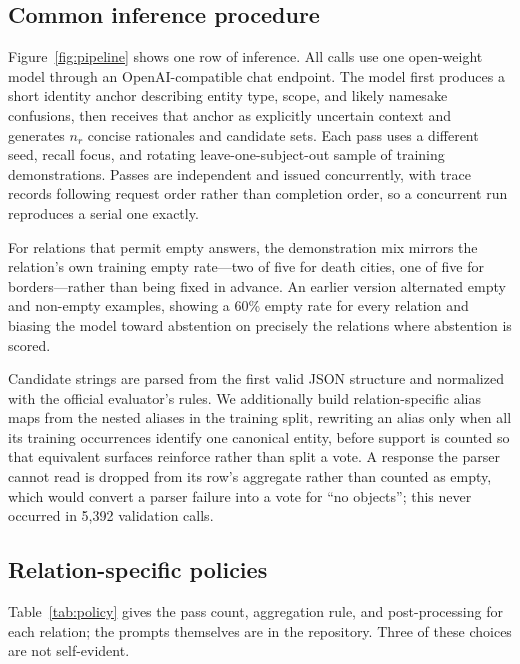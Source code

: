 \documentclass[11pt]{article}
\begin{document}
\subsection{Common inference procedure}

Figure~\ref{fig:pipeline} shows one row of inference. All calls use one
open-weight model through an OpenAI-compatible chat endpoint. The model first
produces a short identity anchor describing entity type, scope, and likely
namesake confusions, then receives that anchor as explicitly uncertain context
and generates $n_r$ concise rationales and candidate sets. Each pass uses a
different seed, recall focus, and rotating leave-one-subject-out sample of
training demonstrations. Passes are independent and issued concurrently, with
trace records following request order rather than completion order, so a
concurrent run reproduces a serial one exactly.

For relations that permit empty answers, the demonstration mix mirrors the
relation's own training empty rate---two of five for death cities, one of five
for borders---rather than being fixed in advance. An earlier version alternated
empty and non-empty examples, showing a 60\% empty rate for every relation and
biasing the model toward abstention on precisely the relations where abstention
is scored.

Candidate strings are parsed from the first valid JSON structure and normalized
with the official evaluator's rules. We additionally build relation-specific
alias maps from the nested aliases in the training split, rewriting an alias
only when all its training occurrences identify one canonical entity, before
support is counted so that equivalent surfaces reinforce rather than split a
vote. A response the parser cannot read is dropped from its row's aggregate
rather than counted as empty, which would convert a parser failure into a vote
for ``no objects''; this never occurred in 5{,}392 validation calls.

\subsection{Relation-specific policies}

Table~\ref{tab:policy} gives the pass count, aggregation rule, and
post-processing for each relation; the prompts themselves are in the
repository. Three of these choices are not self-evident.
\end{document}
